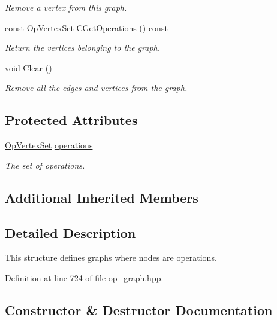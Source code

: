 \begin{DoxyCompactItemize}
\begin{DoxyCompactList}\small\item\em Remove a vertex from this graph. \end{DoxyCompactList}\item 
const \hyperlink{classOpVertexSet}{Op\+Vertex\+Set} \hyperlink{classOpGraphsCollection_a625d45ef62e1f99746251575b18c1519}{C\+Get\+Operations} () const
\begin{DoxyCompactList}\small\item\em Return the vertices belonging to the graph. \end{DoxyCompactList}\item 
void \hyperlink{classOpGraphsCollection_a625992dd75b06e471812a41fbcd4502c}{Clear} ()
\begin{DoxyCompactList}\small\item\em Remove all the edges and vertices from the graph. \end{DoxyCompactList}\end{DoxyCompactItemize}
\subsection*{Protected Attributes}
\begin{DoxyCompactItemize}
\item 
\hyperlink{classOpVertexSet}{Op\+Vertex\+Set} \hyperlink{classOpGraphsCollection_a138e24ba0dc9e5006face1e10c0b9aa3}{operations}
\begin{DoxyCompactList}\small\item\em The set of operations. \end{DoxyCompactList}\end{DoxyCompactItemize}
\subsection*{Additional Inherited Members}


\subsection{Detailed Description}
This structure defines graphs where nodes are operations. 

Definition at line 724 of file op\+\_\+graph.\+hpp.



\subsection{Constructor \& Destructor Documentation}
\mbox{\label{classOpGraphsCollection_aa142b89a687698e352260755e6e38632}} 
